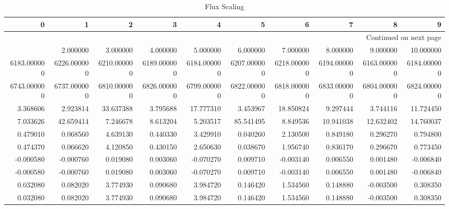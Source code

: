 \begin{longtable}{rrrrrrrrrr}
\caption{Flux Scaling}\\
\toprule
           0 &            1 &            2 &            3 &            4 &            5 &            6 &            7 &            8 &            9 \\
\midrule
\endhead
\midrule
\multicolumn{10}{r}{{Continued on next page}} \\
\midrule
\endfoot

\bottomrule
\endlastfoot
    1.000000 &     2.000000 &     3.000000 &     4.000000 &     5.000000 &     6.000000 &     7.000000 &     8.000000 &     9.000000 &    10.000000 \\
 6183.000000 &  6226.000000 &  6210.000000 &  6189.000000 &  6184.000000 &  6207.000000 &  6218.000000 &  6194.000000 &  6163.000000 &  6184.000000 \\
 6743.000000 &  6737.000000 &  6810.000000 &  6826.000000 &  6799.000000 &  6822.000000 &  6818.000000 &  6833.000000 &  6804.000000 &  6824.000000 \\
    3.368606 &     2.923814 &    33.637388 &     3.795688 &    17.777310 &     3.453967 &    18.850824 &     9.297444 &     3.744116 &    11.724450 \\
    7.033626 &    42.659414 &     7.246678 &     8.613204 &     5.203517 &    85.541495 &     8.849536 &    10.941038 &    12.632402 &    14.760037 \\
    0.479010 &     0.068560 &     4.639130 &     0.440330 &     3.429910 &     0.040260 &     2.130500 &     0.849180 &     0.296270 &     0.794800 \\
    0.474370 &     0.066620 &     4.120850 &     0.430150 &     2.650630 &     0.038670 &     1.956740 &     0.836170 &     0.296670 &     0.773450 \\
   -0.000580 &    -0.000760 &     0.019080 &     0.003060 &    -0.070270 &     0.009710 &    -0.003140 &     0.006550 &     0.001480 &    -0.006840 \\
   -0.000580 &    -0.000760 &     0.019080 &     0.003060 &    -0.070270 &     0.009710 &    -0.003140 &     0.006550 &     0.001480 &    -0.006840 \\
    0.032080 &     0.082020 &     3.774930 &     0.090680 &     3.984720 &     0.146420 &     1.534560 &     0.148880 &    -0.003500 &     0.308350 \\
    0.032080 &     0.082020 &     3.774930 &     0.090680 &     3.984720 &     0.146420 &     1.534560 &     0.148880 &    -0.003500 &     0.308350 \\

\end{longtable}
